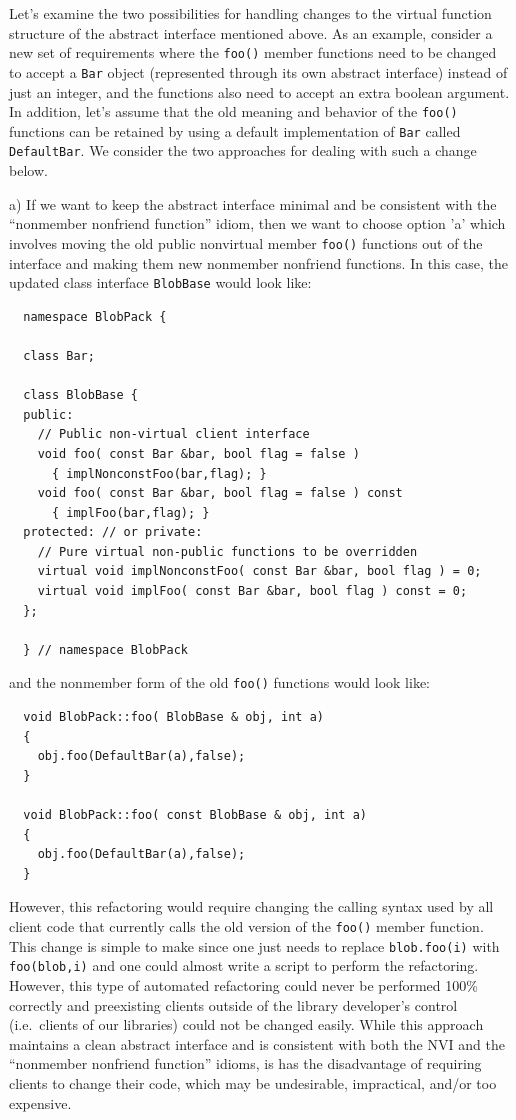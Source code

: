 \documentclass[pdf,ps2pdf,11pt]{SANDreport}
\begin{document}
Let's examine the two possibilities for handling changes to the virtual
function structure of the abstract interface mentioned above.  As an example,
consider a new set of requirements where the {}\texttt{foo()} member functions
need to be changed to accept a {}\texttt{Bar} object (represented through its
own abstract interface) instead of just an integer, and the functions also
need to accept an extra boolean argument.  In addition, let's assume that the
old meaning and behavior of the {}\texttt{foo()} functions can be retained by
using a default implementation of {}\texttt{Bar} called {}\texttt{DefaultBar}.
We consider the two approaches for dealing with such a change below.

a) If we want to keep the abstract interface minimal and be consistent with
the ``nonmember nonfriend function'' idiom, then we want to choose option 'a'
which involves moving the old public nonvirtual member {}\texttt{foo()}
functions out of the interface and making them new nonmember nonfriend
functions.  In this case, the updated class interface {}\texttt{BlobBase}
would look like:

{\small\begin{verbatim}
  namespace BlobPack {

  class Bar;

  class BlobBase {
  public:
    // Public non-virtual client interface
    void foo( const Bar &bar, bool flag = false )
      { implNonconstFoo(bar,flag); }
    void foo( const Bar &bar, bool flag = false ) const
      { implFoo(bar,flag); }
  protected: // or private:
    // Pure virtual non-public functions to be overridden
    virtual void implNonconstFoo( const Bar &bar, bool flag ) = 0;
    virtual void implFoo( const Bar &bar, bool flag ) const = 0;
  };

  } // namespace BlobPack
\end{verbatim}}

{}\noindent{}and the nonmember form of the old {}\texttt{foo()} functions
would look like:

{\small\begin{verbatim}
  void BlobPack::foo( BlobBase & obj, int a)
  {
    obj.foo(DefaultBar(a),false);
  }

  void BlobPack::foo( const BlobBase & obj, int a)
  {
    obj.foo(DefaultBar(a),false);
  }
\end{verbatim}}

However, this refactoring would require changing the calling syntax used by
all client code that currently calls the old version of the {}\texttt{foo()}
member function.  This change is simple to make since one just needs to
replace {}\texttt{blob.foo(i)} with {}\texttt{foo(blob,i)} and one could
almost write a script to perform the refactoring.  However, this type of
automated refactoring could never be performed 100\% correctly and preexisting
clients outside of the library developer's control (i.e.\ clients of our
libraries) could not be changed easily.  While this approach maintains a clean
abstract interface and is consistent with both the NVI and the ``nonmember
nonfriend function'' idioms, is has the disadvantage of requiring clients to
change their code, which may be undesirable, impractical, and/or too
expensive.
\end{document}
